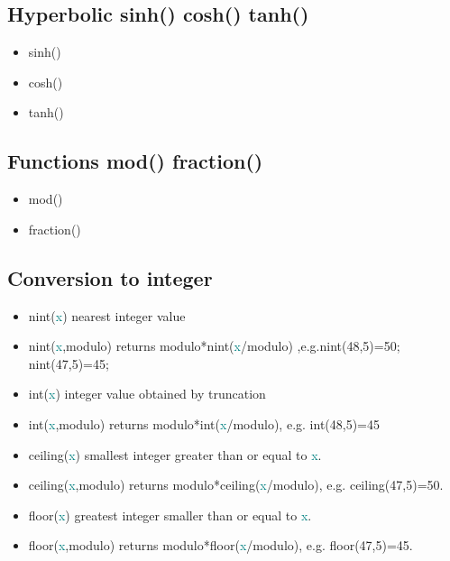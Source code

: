 {\subsection{Hyperbolic  \textcolor{VioletRed}{sinh}() \textcolor{VioletRed}{cosh}() \textcolor{VioletRed}{tanh}()} 
\label{hyper} 
\begin{itemize} 
\item \textcolor{VioletRed}{sinh}() 
\item \textcolor{VioletRed}{cosh}() 
\item \textcolor{VioletRed}{tanh}() 
\end{itemize} 
\subsection{Functions \textcolor{VioletRed}{mod}() \textcolor{VioletRed}{fraction}()} 
\label{mod} 
\begin{itemize} 
\item \textcolor{VioletRed}{mod}() 
\item \textcolor{VioletRed}{fraction}() 
\end{itemize} 
\subsection{Conversion to integer} 
\label{conversion} 
 
\begin{itemize} 
\item \textcolor{VioletRed}{nint}(\textcolor{teal}{x}) nearest integer value 
\item \textcolor{VioletRed}{nint}(\textcolor{teal}{x},modulo) returns modulo*\textcolor{VioletRed}{nint}(\textcolor{teal}{x}/modulo) ,e.g.\textcolor{VioletRed}{nint}(48,5)=50; \textcolor{VioletRed}{nint}(47,5)=45; 
\item \textcolor{VioletRed}{int}(\textcolor{teal}{x}) integer value obtained by truncation 
\item \textcolor{VioletRed}{int}(\textcolor{teal}{x},modulo) returns modulo*\textcolor{VioletRed}{int}(\textcolor{teal}{x}/modulo), e.g. \textcolor{VioletRed}{int}(48,5)=45 
\item \textcolor{VioletRed}{ceiling}(\textcolor{teal}{x}) smallest integer greater than or equal to {\textcolor{teal}{x}}. 
\item \textcolor{VioletRed}{ceiling}(\textcolor{teal}{x},modulo) returns modulo*\textcolor{VioletRed}{ceiling}(\textcolor{teal}{x}/modulo), e.g. \textcolor{VioletRed}{ceiling}(47,5)=50. 
\item \textcolor{VioletRed}{floor}(\textcolor{teal}{x}) greatest integer smaller than or equal to {\textcolor{teal}{x}}. 
\item \textcolor{VioletRed}{floor}(\textcolor{teal}{x},modulo) returns modulo*\textcolor{VioletRed}{floor}(\textcolor{teal}{x}/modulo), e.g. \textcolor{VioletRed}{floor}(47,5)=45. 
\end{itemize} 
}
